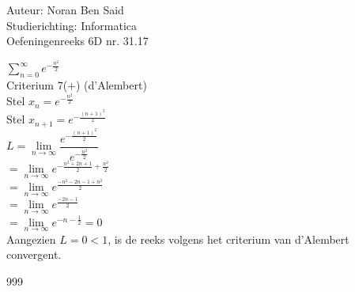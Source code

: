 \documentclass[a4paper]{article}
\begin{document}
\noindent \large Auteur: Noran Ben Said \\
\noindent \large Studierichting: Informatica \\
\noindent \large Oefeningenreeks 6D nr. 31.17\\

\medskip
\normalsize

$\displaystyle\sum_{n=0}^{\infty} e^{-\tfrac{n^2}{2}}$ \\

Criterium 7(+) (d'Alembert)\\

Stel $x_n = e^{-\tfrac{n^2}{2}}$ \\

Stel $x_{n+1} = e^{-\tfrac{(n+1)^2}{2}}$ \\

$L = \lim\limits_{n \to \infty} \dfrac{e^{-\tfrac{(n+1)^2}{2}}}{e^{-\tfrac{n^2}{2}}}$ \\

$= \lim\limits_{n \to \infty} e^{-\tfrac{n^2+2n+1}{2} + \tfrac{n^2}{2}}$ \\

$= \lim\limits_{n \to \infty} e^{\tfrac{-n^2-2n-1+n^2}{2}}$ \\

$= \lim\limits_{n \to \infty} e^{\tfrac{-2n-1}{2}}$ \\

$= \lim\limits_{n \to \infty} e^{-n - \tfrac{1}{2}} = 0$ \\

Aangezien $L = 0 < 1$, is de reeks volgens het criterium van d'Alembert convergent.

\begin{thebibliography}{999}
\end{thebibliography}
\end{document}
